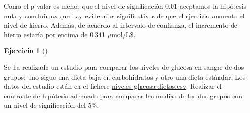 \documentclass[
  a4paper,
]{scrreport}
\theoremstyle{definition}
\newtheorem{exercise}{Ejercicio}[chapter]
\theoremstyle{remark}
\begin{document}
\begin{tcolorbox}
Como el p-valor es menor que el nivel de significación \(0.01\)
aceptamos la hipótesis nula y concluimos que hay evidencias
significativas de que el ejercicio aumenta el nivel de hierro. Además,
de acuerdo al intervalo de confianza, el incremento de hierro estaría
por encima de 0.341 \(\mu\)mol/L\$.

\end{tcolorbox}

\begin{exercise}[]\protect\hypertarget{exr-contraste-comparacion-medias-glucosa}{}\label{exr-contraste-comparacion-medias-glucosa}

Se ha realizado un estudio para comparar los niveles de glucosa en
sangre de dos grupos: uno sigue una dieta baja en carbohidratos y otro
una dieta estándar. Los datos del estudio están en el fichero
\href{datos/niveles-glucosa-dietas.csv}{niveles-glucosa-dietas.csv}.
Realizar el contraste de hipótesis adecuado para comparar las medias de
los dos grupos con un nivel de significación del 5\%.

\end{exercise}
\end{document}
